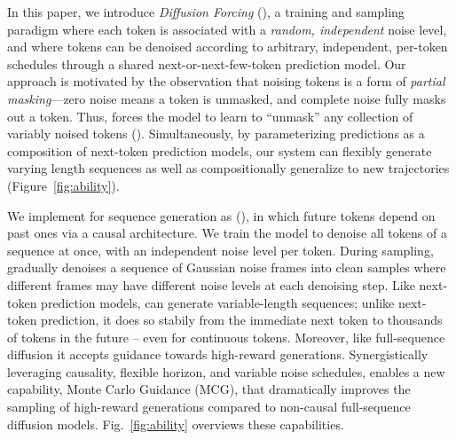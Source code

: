 In this paper, we introduce \emph{Diffusion Forcing} ({\algshort}), a training and sampling paradigm where each token is associated with a \emph{random, independent} noise level, and where tokens can be denoised according to arbitrary, independent, per-token schedules through a shared next-or-next-few-token prediction model. Our approach is motivated by the observation that noising tokens is a form of \emph{partial masking}---zero noise means a token is unmasked, and complete noise fully masks out a token. Thus, \algshort{} forces the model to learn to ``unmask'' any collection of variably noised tokens (). Simultaneously, by parameterizing predictions as a composition of next-token prediction models, our system can flexibly generate varying length sequences as well as compositionally generalize to new trajectories (Figure~\ref{fig:ability}).



We implement \algshort{} for sequence generation as \emph{\algoseq{}} ({\algshortseq}), in which future tokens depend on past ones via a causal architecture.
We train the model to denoise all tokens of a sequence at once, with an independent noise level per token. 
During sampling, \algshortseq{} gradually denoises a sequence of Gaussian noise frames into clean samples where different frames may have different noise levels at each denoising step.
Like  next-token prediction models, \algshortseq{} can generate variable-length sequences; unlike next-token prediction, it does so stabily from the immediate next token to thousands of tokens in the future -- even for continuous tokens. Moreover, like full-sequence diffusion it accepts guidance towards high-reward generations. Synergistically leveraging  causality, flexible horizon, and variable noise schedules, \algshortseq{} enables a new capability, 
Monte Carlo Guidance (MCG), that dramatically improves the sampling of high-reward generations   compared to non-causal full-sequence diffusion models.  Fig.~\ref{fig:ability}  overviews these capabilities.
 



